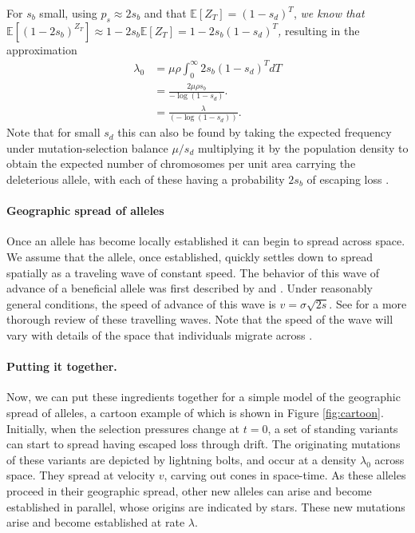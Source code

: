 \documentclass{article}
\newcommand{\plr}[1]{{\it\color{Fuchsia}#1}}
\newcommand{\E}{\mathbb{E}}
\begin{document}
For $s_b$ small, using $p_s \approx 2s_b$ and that $\E[Z_T]=(1-s_d)^T$,
\plr{we know that $\E[(1-2s_b)^{Z_T}] \approx 1-2s_b \E[Z_T] = 1-2s_b (1-s_d)^T$,}
resulting in the approximation
\begin{align}
    \lambda_0 &= \mu \rho \int_0^\infty 2s_b (1-s_d)^{T} dT \\
        &= \frac{ 2 \mu \rho s_b }{ -\log(1-s_d) } .\\
        & =  \frac{\lambda }{ (-\log(1-s_d)) }.
\end{align}
Note that for small $s_d$ this can also be found by taking the expected frequency under mutation-selection
balance $\mu/s_d $ \citep{Haldane:27,Haldane:37} multiplying it by the
population density to obtain the expected number of chromosomes per unit area
carrying the deleterious allele, with each of these having a
probability $2s_b$ of escaping loss \citep[an analogous approach to
that taken by ][]{Orr:01}
. 

\paragraph{Geographic spread of alleles} 
Once an allele has become locally established it can begin to spread across space. 
We assume that the allele, once established, 
quickly settles down to spread spatially as a traveling wave of constant speed. 
The behavior of this wave of advance of a beneficial allele was first described by 
\citet{fisher1937wave} and \citet*{KPP1937}. 
Under reasonably general conditions, the speed of advance of this wave is $v = \sigma \sqrt{2s}$. 
See \citet{ralphcoop2010} for a more thorough review of these travelling waves.
Note that the speed of the wave will vary
with details of the space that individuals migrate across
\citep[e.g.\ see ][ for comparisons to migration on discrete grids]{Slatkin-speed:76,SlatkinCharlesworth:78}.

\paragraph{Putting it together.}
Now, we can put these ingredients together for a simple model of the geographic spread of alleles, 
a cartoon example of which is shown in Figure \ref{fig:cartoon}. 
Initially, when the selection pressures change at $t=0$, 
a set of standing variants can start to spread having escaped loss through drift. 
The originating mutations of these variants are depicted by lightning bolts, and occur at a density $\lambda_0$ across space. 
They spread at velocity $v$, carving out cones in space-time. 
As these alleles proceed in their geographic spread, other new alleles can arise and become established in parallel, 
whose origins are indicated by stars.
These new mutations arise and become established at rate $\lambda$.
\end{document}
